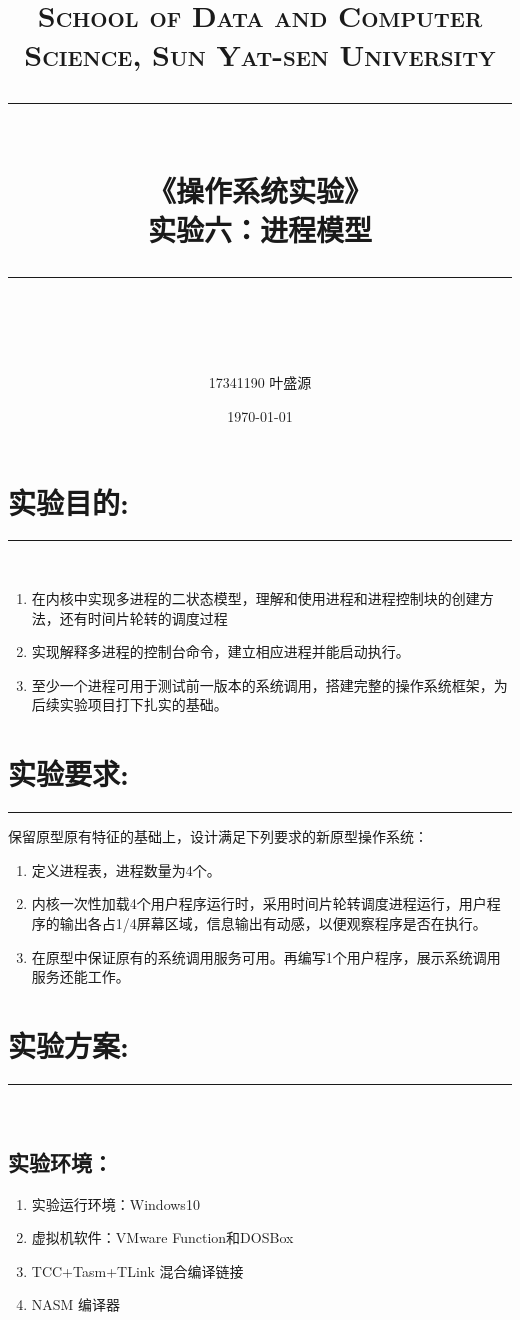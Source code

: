 \documentclass[UTF8]{article}
\title{	
\normalfont \normalsize
\textsc{School of Data and Computer Science, Sun Yat-sen University} \\ [25pt] %
\rule{\textwidth}{0.5pt} \\[0.4cm] %
{\LARGE\heiti\bfseries  《操作系统实验》}\\[0.5cm] %
{\huge\bfseries\heiti 实验六：进程模型 } \\
\rule{\textwidth}{2pt} \\[0.5cm] %
\author{\Large17341190 叶盛源}
\date{\normalsize\today}
}
\begin{document}
\maketitle
\tableofcontents
\newpage
\heiti 

\section{实验目的:}
\noindent\rule[0.2\baselineskip]{\textwidth}{0.5pt}\\[-23pt]
\begin{enumerate}[1)]%
\heiti 
\setlength{\itemsep}{0em}
	\item 在内核中实现多进程的二状态模型，理解和使用进程和进程控制块的创建方法，还有时间片轮转的调度过程
	\item 实现解释多进程的控制台命令，建立相应进程并能启动执行。
	\item 至少一个进程可用于测试前一版本的系统调用，搭建完整的操作系统框架，为后续实验项目打下扎实的基础。
	\end{enumerate}

\section{实验要求:}
\noindent\rule[0.2\baselineskip]{\textwidth}{0.5pt}
保留原型原有特征的基础上，设计满足下列要求的新原型操作系统：
\begin{enumerate}[1)]%
\heiti 
\setlength{\itemsep}{0em}
	\item 定义进程表，进程数量为4个。
	\item 内核一次性加载4个用户程序运行时，采用时间片轮转调度进程运行，用户程序的输出各占1/4屏幕区域，信息输出有动感，以便观察程序是否在执行。
	\item 在原型中保证原有的系统调用服务可用。再编写1个用户程序，展示系统调用服务还能工作。
	\end{enumerate}


\section{实验方案:}
\noindent\rule[0.2\baselineskip]{\textwidth}{0.5pt}\\[-32pt]

\subsection{实验环境：}
\begin{enumerate}[1)]%
\heiti 
\setlength{\itemsep}{0em}
	\item 实验运行环境：Windows10
	\item 虚拟机软件：VMware Function和DOSBox
	\item TCC+Tasm+TLink 混合编译链接
	\item NASM 编译器
	\end{enumerate}
\end{document}
